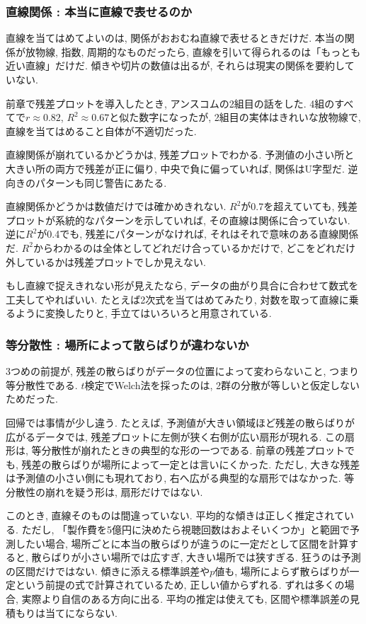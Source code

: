 \subsubsection*{直線関係 : 本当に直線で表せるのか}

直線を当てはめてよいのは, 関係がおおむね直線で表せるときだけだ.
本当の関係が放物線, 指数, 周期的なものだったら, 直線を引いて得られるのは「もっとも近い直線」だけだ.
傾きや切片の数値は出るが, それらは現実の関係を要約していない.

前章で残差プロットを導入したとき, アンスコムの2組目の話をした.
4組のすべてで$r \approx 0.82$, $R^2 \approx 0.67$と似た数字になったが, 2組目の実体はきれいな放物線で, 直線を当てはめること自体が不適切だった.

直線関係が崩れているかどうかは, 残差プロットでわかる.
予測値の小さい所と大きい所の両方で残差が正に偏り, 中央で負に偏っていれば, 関係はU字型だ.
逆向きのパターンも同じ警告にあたる.

直線関係かどうかは数値だけでは確かめきれない.
$R^2$が0.7を超えていても, 残差プロットが系統的なパターンを示していれば, その直線は関係に合っていない.
逆に$R^2$が0.4でも, 残差にパターンがなければ, それはそれで意味のある直線関係だ.
$R^2$からわかるのは全体としてどれだけ合っているかだけで, どこをどれだけ外しているかは残差プロットでしか見えない.

もし直線で捉えきれない形が見えたなら, データの曲がり具合に合わせて数式を工夫してやればいい. たとえば2次式を当てはめてみたり, 対数を取って直線に乗るように変換したりと, 手立てはいろいろと用意されている.

\subsubsection*{等分散性 : 場所によって散らばりが違わないか}

3つめの前提が, 残差の散らばりがデータの位置によって変わらないこと, つまり等分散性である.
$t$検定でWelch法を採ったのは, 2群の分散が等しいと仮定しないためだった.

回帰では事情が少し違う.
たとえば, 予測値が大きい領域ほど残差の散らばりが広がるデータでは, 残差プロットに左側が狭く右側が広い扇形が現れる.
この扇形は, 等分散性が崩れたときの典型的な形の一つである.
前章の残差プロットでも, 残差の散らばりが場所によって一定とは言いにくかった.
ただし, 大きな残差は予測値の小さい側にも現れており, 右へ広がる典型的な扇形ではなかった.
等分散性の崩れを疑う形は, 扇形だけではない.

このとき, 直線そのものは間違っていない.
平均的な傾きは正しく推定されている.
ただし, 「製作費を5億円に決めたら視聴回数はおよそいくつか」と範囲で予測したい場合, 場所ごとに本当の散らばりが違うのに一定だとして区間を計算すると, 散らばりが小さい場所では広すぎ, 大きい場所では狭すぎる.
狂うのは予測の区間だけではない.
傾きに添える標準誤差や$p$値も, 場所によらず散らばりが一定という前提の式で計算されているため, 正しい値からずれる.
ずれは多くの場合, 実際より自信のある方向に出る.
平均の推定は使えても, 区間や標準誤差の見積もりは当てにならない.

